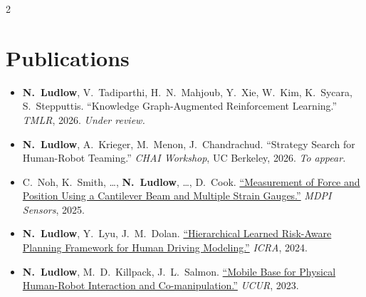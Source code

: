 \documentclass[letterpaper,10pt]{article}
\newcommand{\resumeItem}[1]{
  \item\small{{#1 \vspace{-2pt}}}
}
\newcommand{\resumeItemListStart}{\begin{itemize}[itemsep=0pt, parsep=0pt, topsep=1pt, leftmargin=0.13in]}
\newcommand{\resumeItemListEnd}{\end{itemize}\vspace{-6pt}}
\begin{document}
\begin{paracol}{2}
\section{Publications}
      \resumeItemListStart
        \resumeItem{\textbf{N.\ Ludlow}, V.\ Tadiparthi, H.\ N.\ Mahjoub, Y.\ Xie, W.\ Kim, K.\ Sycara, S.\ Stepputtis. ``Knowledge Graph-Augmented Reinforcement Learning.'' \textit{TMLR}, 2026. \textit{Under review.}}
        \resumeItem{\textbf{N.\ Ludlow}, A.\ Krieger, M.\ Menon, J.\ Chandrachud. ``Strategy Search for Human-Robot Teaming.'' \textit{CHAI Workshop}, UC Berkeley, 2026. \textit{To appear.}}
        \resumeItem{C.\ Noh, K.\ Smith, \ldots, \textbf{N.\ Ludlow}, \ldots, D.\ Cook. \href{https://doi.org/10.3390/s25216561}{``Measurement of Force and Position Using a Cantilever Beam and Multiple Strain Gauges.''} \textit{MDPI Sensors}, 2025.}
        \resumeItem{\textbf{N.\ Ludlow}, Y.\ Lyu, J.\ M.\ Dolan. \href{https://ieeexplore.ieee.org/document/10610354}{``Hierarchical Learned Risk-Aware Planning Framework for Human Driving Modeling.''} \textit{ICRA}, 2024.}
        \resumeItem{\textbf{N.\ Ludlow}, M.\ D.\ Killpack, J.\ L.\ Salmon. \href{https://our.utah.edu/ucur/mobile-base-for-physical-human-robot-interaction-and-co-manipulation/}{``Mobile Base for Physical Human-Robot Interaction and Co-manipulation.''} \textit{UCUR}, 2023.}
      \resumeItemListEnd

\end{paracol}
\end{document}
